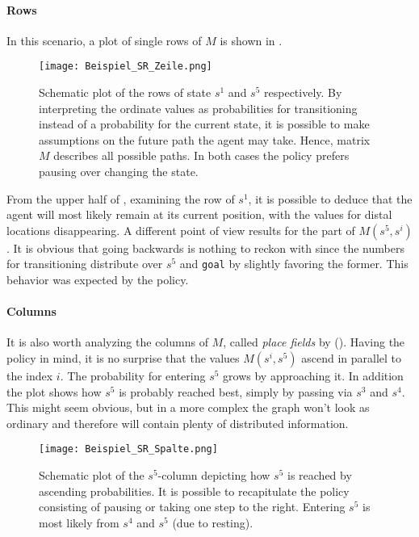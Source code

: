 \paragraph{Rows}
In this scenario, a plot of single rows of $ M $ is shown in \figref{\ref{fig: sr-zeile}}.
\begin{figure}
	\centering
		\texttt{[image: Beispiel\_SR\_Zeile.png]}
	\caption{Schematic plot of the rows of state $ s^1 $ and $ s^5 $ respectively. By interpreting the ordinate values as probabilities for transitioning instead of a probability for the current state, it is possible to make assumptions on the future path the agent may take. Hence, matrix $ M $ describes all possible paths. In both cases the policy prefers pausing over changing the state.}
	\label{fig: sr-zeile}
\end{figure}
From the upper half of \figref{\ref{fig: sr-zeile}}, examining the row of $ s^1 $, it is possible to deduce that the agent will most likely remain at its current position, with the values for distal locations disappearing. A different point of view results for the part of $ M(s^5, s^i) $. It is obvious that going backwards is nothing to reckon with since the numbers for transitioning distribute over $ s^5 $ and \texttt{goal} by slightly favoring the former. This behavior was expected by the policy.
%
\paragraph{Columns}
It is also worth analyzing the columns of $ M $, called \emph{place fields} by  (\figref{\ref{fig: sr-spalte}}). Having the policy in mind, it is no surprise that the values $ M(s^i, s^5) $ ascend in parallel to the index $ i $. The probability for entering $ s^5 $ grows by approaching it. In addition the plot shows how $ s^5 $ is probably reached best, simply by passing via $ s^3 $ and $ s^4 $. This might seem obvious, but in a more complex \cognitiveroom{} the graph won't look as ordinary and therefore will contain plenty of distributed information. %
\begin{figure}
	\centering
		\texttt{[image: Beispiel\_SR\_Spalte.png]}
	\caption{Schematic plot of the $ s^5 $-column depicting how $ s^5 $ is reached by ascending probabilities. It is possible to recapitulate the policy consisting of pausing or taking one step to the right. Entering $ s^5 $ is most likely from $ s^4 $ and $ s^5 $ (due to resting). }
	\label{fig: sr-spalte}
\end{figure}
